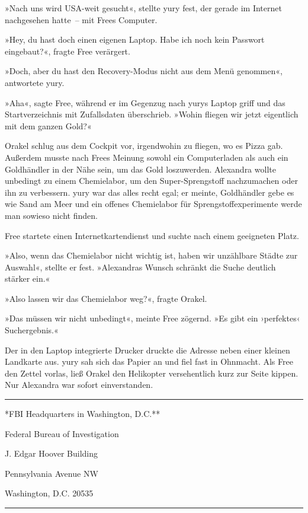 »Nach uns wird USA-weit gesucht«, stellte yury fest, der gerade im Internet nachgesehen hatte~– mit Frees Computer.

»Hey, du hast doch einen eigenen Laptop. Habe ich noch kein Passwort eingebaut?«, fragte Free verärgert.

»Doch, aber du hast den Recovery-Modus nicht aus dem Menü genommen«, antwortete yury.

»Aha«, sagte Free, während er im Gegenzug nach yurys Laptop griff und das Startverzeichnis mit Zufallsdaten überschrieb. »Wohin fliegen wir jetzt eigentlich mit dem ganzen Gold?«

Orakel schlug aus dem Cockpit vor, irgendwohin zu fliegen, wo es Pizza gab. Außerdem musste nach Frees Meinung sowohl ein Computerladen als auch ein Goldhändler in der Nähe sein, um das Gold loszuwerden. Alexandra wollte unbedingt zu einem Chemielabor, um den Super-Sprengstoff nachzumachen oder ihn zu verbessern. yury war das alles recht egal; er meinte, Goldhändler gebe es wie Sand am Meer und ein offenes Chemielabor für Sprengstoffexperimente werde man sowieso nicht finden.

Free startete einen Internetkartendienst und suchte nach einem geeigneten Platz.

»Also, wenn das Chemielabor nicht wichtig ist, haben wir unzählbare Städte zur Auswahl«, stellte er fest. »Alexandras Wunsch schränkt die Suche deutlich stärker ein.«

»Also lassen wir das Chemielabor weg?«, fragte Orakel.

»Das müssen wir nicht unbedingt«, meinte Free zögernd. »Es gibt ein ›perfektes‹ Suchergebnis.«

Der in den Laptop integrierte Drucker druckte die Adresse neben einer kleinen Landkarte aus. yury sah sich das Papier an und fiel fast in Ohnmacht. Als Free den Zettel vorlas, ließ Orakel den Helikopter versehentlich kurz zur Seite kippen. Nur Alexandra war sofort einverstanden.

\noindent \parbox{\textwidth}{ \vspace{3ex} \hrule \vspace{3ex}

    \begin{footnotesize}
    \begin{ttfamily}

\noindent **FBI Headquarters in Washington, D.C.**

\noindent Federal Bureau of Investigation

\noindent J. Edgar Hoover Building

 Pennsylvania Avenue NW

\noindent Washington, D.C. 20535

    \end{ttfamily}
    \end{footnotesize}

\vspace{3ex} \hrule \vspace{3ex} }

